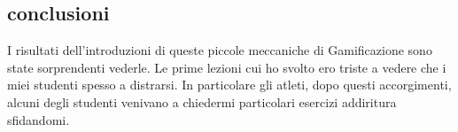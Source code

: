 \subsection{conclusioni}

I risultati dell'introduzioni di queste piccole meccaniche di Gamificazione sono state sorprendenti vederle. Le prime lezioni cui ho svolto ero triste a vedere che i miei studenti spesso a distrarsi. In particolare gli atleti, dopo questi accorgimenti, alcuni degli studenti venivano a chiedermi particolari esercizi addiritura sfidandomi.
\newpage
